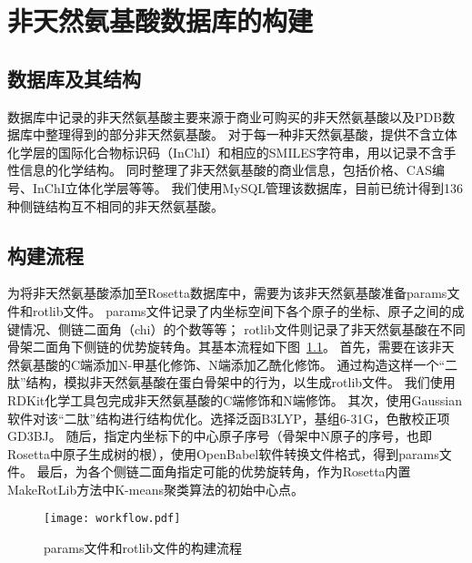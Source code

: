 
\chapter{非天然氨基酸数据库的构建}

\section{数据库及其结构}

数据库中记录的非天然氨基酸主要来源于商业可购买的非天然氨基酸以及PDB数据库中整理得到的部分非天然氨基酸。
对于每一种非天然氨基酸，提供不含立体化学层的国际化合物标识码（InChI）和相应的SMILES字符串，用以记录不含手性信息的化学结构。
同时整理了非天然氨基酸的商业信息，包括价格、CAS编号、InChI立体化学层等等。
我们使用MySQL管理该数据库，目前已统计得到136种侧链结构互不相同的非天然氨基酸。



\section{构建流程}

为将非天然氨基酸添加至Rosetta数据库中，需要为该非天然氨基酸准备params文件和rotlib文件。
params文件记录了内坐标空间下各个原子的坐标、原子之间的成键情况、侧链二面角（chi）的个数等等；
rotlib文件则记录了非天然氨基酸在不同骨架二面角下侧链的优势旋转角。其基本流程如下图~\ref{fig:workflow}。
首先，需要在该非天然氨基酸的C端添加N-甲基化修饰、N端添加乙酰化修饰。
通过构造这样一个“二肽”结构，模拟非天然氨基酸在蛋白骨架中的行为，以生成rotlib文件。
我们使用RDKit化学工具包\cite{gRN118}完成非天然氨基酸的C端修饰和N端修饰。
其次，使用Gaussian软件\cite{RN113}对该“二肽”结构进行结构优化。选择泛函B3LYP，基组6-31G，色散校正项GD3BJ。
随后，指定内坐标下的中心原子序号（骨架中N原子的序号，也即Rosetta中原子生成树的根），使用OpenBabel软件\cite{RN117}转换文件格式，得到params文件。
最后，为各个侧链二面角指定可能的优势旋转角，作为Rosetta内置MakeRotLib方法中K-means聚类算法的初始中心点。
\begin{figure}
  \centering
  \texttt{[image: workflow.pdf]}
  \caption{params文件和rotlib文件的构建流程}
  \label{fig:workflow}
\end{figure}

